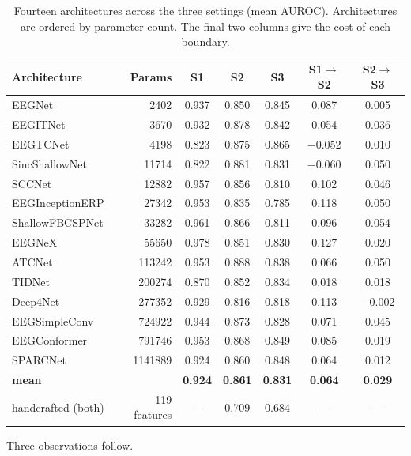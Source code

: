 \documentclass[11pt,a4paper]{article}
\begin{document}
\begin{table}[t]
\centering\small
\caption{Fourteen architectures across the three settings (mean AUROC).
Architectures are ordered by parameter count. The final two columns give the
cost of each boundary.}
\label{tab:dl}
\begin{tabular}{lrccccc}
\toprule
Architecture & Params & S1 & S2 & S3 & S1$\to$S2 & S2$\to$S3 \\
\midrule
EEGNet           & \num{2402}    & 0.937 & 0.850 & 0.845 &  0.087 &  0.005 \\
EEGITNet         & \num{3670}    & 0.932 & 0.878 & 0.842 &  0.054 &  0.036 \\
EEGTCNet         & \num{4198}    & 0.823 & 0.875 & 0.865 & $-$0.052 & 0.010 \\
SincShallowNet   & \num{11714}   & 0.822 & 0.881 & 0.831 & $-$0.060 & 0.050 \\
SCCNet           & \num{12882}   & 0.957 & 0.856 & 0.810 &  0.102 &  0.046 \\
EEGInceptionERP  & \num{27342}   & 0.953 & 0.835 & 0.785 &  0.118 &  0.050 \\
ShallowFBCSPNet  & \num{33282}   & 0.961 & 0.866 & 0.811 &  0.096 &  0.054 \\
EEGNeX           & \num{55650}   & 0.978 & 0.851 & 0.830 &  0.127 &  0.020 \\
ATCNet           & \num{113242}  & 0.953 & 0.888 & 0.838 &  0.066 &  0.050 \\
TIDNet           & \num{200274}  & 0.870 & 0.852 & 0.834 &  0.018 &  0.018 \\
Deep4Net         & \num{277352}  & 0.929 & 0.816 & 0.818 &  0.113 & $-$0.002 \\
EEGSimpleConv    & \num{724922}  & 0.944 & 0.873 & 0.828 &  0.071 &  0.045 \\
EEGConformer     & \num{791746}  & 0.953 & 0.868 & 0.849 &  0.085 &  0.019 \\
SPARCNet         & \num{1141889} & 0.924 & 0.860 & 0.848 &  0.064 &  0.012 \\
\midrule
\textbf{mean}    &               & \textbf{0.924} & \textbf{0.861} & \textbf{0.831} & \textbf{0.064} & \textbf{0.029} \\
\addlinespace
handcrafted (both) & 119 features & --- & 0.709 & 0.684 & --- & --- \\
\bottomrule
\end{tabular}
\end{table}

Three observations follow.
\end{document}
